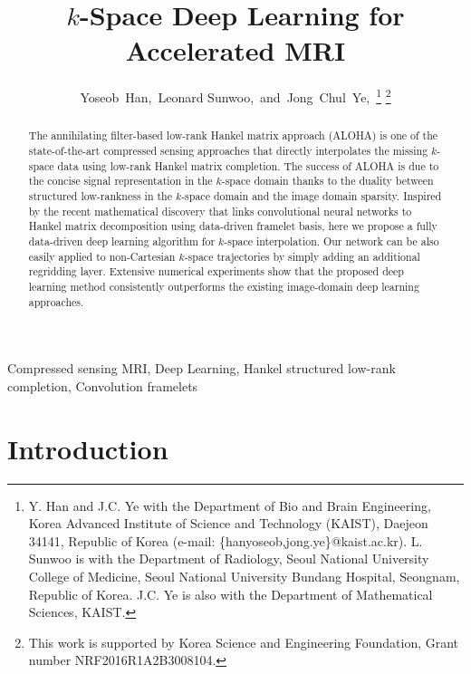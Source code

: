 \documentclass[10pt,journal]{IEEEtran}
\newcommand{\0}{{\boldsymbol{0}}}
\begin{document}
\title{ $k$-Space   Deep Learning for Accelerated MRI }
\date{\vspace{-4ex}}

\author{Yoseob~Han,~Leonard Sunwoo,~and~Jong~Chul~Ye,~\thanks{Y. Han and J.C. Ye with the Department of Bio and Brain Engineering, Korea Advanced Institute of Science and Technology (KAIST), 
		Daejeon 34141, Republic of Korea (e-mail: \{hanyoseob,jong.ye\}@kaist.ac.kr). L. Sunwoo is with the Department of Radiology, Seoul National University College of Medicine, Seoul National University Bundang Hospital, Seongnam, Republic of Korea.
		J.C. Ye is also with the Department of Mathematical Sciences, KAIST.} 
\thanks{This work is supported by Korea Science and Engineering Foundation, Grant
		number NRF2016R1A2B3008104.}}




\maketitle

\begin{abstract}
The annihilating filter-based low-rank Hankel matrix approach (ALOHA) is one of the state-of-the-art compressed sensing approaches that directly interpolates the missing $k$-space data using low-rank Hankel matrix completion. The success of ALOHA is due to the concise signal representation in the $k$-space domain thanks to the duality between structured low-rankness in the $k$-space domain and the image domain sparsity. Inspired by the recent mathematical discovery  that links convolutional neural networks to Hankel matrix decomposition using data-driven framelet basis,
here we  propose  a fully data-driven  deep learning algorithm for $k$-space interpolation. Our network can be also easily applied to non-Cartesian $k$-space trajectories by simply adding an additional regridding layer. Extensive numerical experiments show that the proposed deep learning method consistently outperforms  the existing image-domain deep learning approaches.
\end{abstract}

\begin{IEEEkeywords}
Compressed sensing MRI,  Deep Learning,  Hankel structured low-rank completion,  Convolution framelets
\end{IEEEkeywords}


\IEEEpeerreviewmaketitle


\section{Introduction}
\label{sec:introduction}
\end{document}

